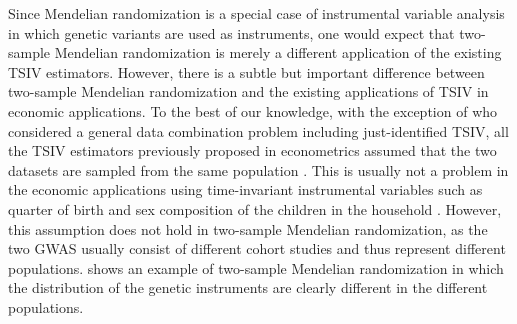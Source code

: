 \documentclass[preprint]{imsart}
\begin{document}
Since Mendelian randomization is a special case of instrumental
variable analysis in which genetic variants are used as instruments,
one would expect that two-sample Mendelian randomization is merely
a different application of the existing TSIV estimators. However,
there is a subtle but important difference between two-sample Mendelian
randomization and the existing applications of TSIV in economic applications. To the
best of our knowledge, with the exception of
\citet{graham2016efficient} who considered a general data combination
problem including just-identified TSIV, all the TSIV estimators
previously proposed in econometrics assumed that the two datasets are
sampled from the same population
\citep{angrist1992effect,ridder2007econometrics,inoue2010two,pacini2016robust}. This
is
usually not a problem in the economic applications using time-invariant
instrumental variables \citep{jappelli1998testing} such as quarter of birth
\citep{angrist1992effect} and sex composition of the children in the
household \citep{currie2000public}. However, this
assumption does not hold in two-sample Mendelian
randomization, as the two GWAS usually consist of different cohort
studies and thus represent different populations. 
shows an example of two-sample Mendelian randomization in which the
distribution of the genetic instruments are clearly different in the
different populations.

\end{document}
